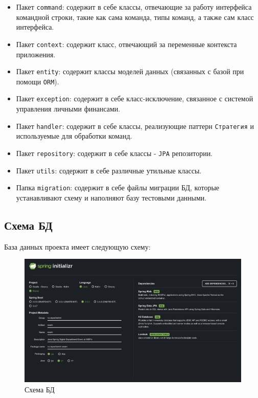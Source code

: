 \documentclass[a4paper, 14pt]{article}
\begin{document}
\begin{itemize}
	\item Пакет \texttt{command}: содержит в себе классы, отвечающие за работу интерфейса командной строки, такие как сама команда, типы команд, а также сам класс интерфейса.
	\item Пакет \texttt{context}: содержит класс, отвечающий за переменные контекста приложения.
	\item Пакет \texttt{entity}: содержит классы моделей данных (связанных с базой при помощи \texttt{ORM}).
	\item Пакет \texttt{exception}: содержит в себе класс-исключение, связанное с системой управления личными финансами.
	\item Пакет \texttt{handler}: содержит в себе классы, реализующие паттерн \texttt{Стратегия} и используемые для обработки команд.
	\item Пакет \texttt{repository}: содержит в себе классы - \texttt{JPA} репозитории.
	\item Пакет \texttt{utils}: содержит в себе различные утильные классы.
	\item Папка \texttt{migration}: содержит в себе файлы миграции БД, которые устанавливают схему и наполняют базу тестовыми данными.
\end{itemize}

\subsection{Схема БД}

База данных проекта имеет следующую схему:

\begin{figure}[H]
	\centering
	\includegraphics[width=17cm]{resources/1.png}
	\caption{Схема БД}
\end{figure}
\end{document}

